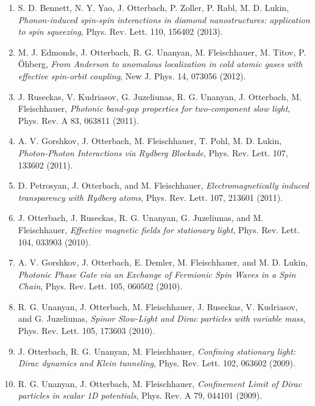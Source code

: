 \documentclass[10pt,centered]{./res} %
\begin{document}
\begin{resume}
\begin{enumerate}
  \item S. D. Bennett, N. Y. Yao, J. Otterbach, P. Zoller, P. Rabl, M. D. Lukin, \textit{Phonon-induced spin-spin interactions in diamond nanostructures: application to spin squeezing}, Phys. Rev. Lett. 110, 156402 (2013).
  
  \item M. J. Edmonds, J. Otterbach, R. G. Unanyan, M. Fleischhauer, M. Titov, P. Öhberg, \textit{From Anderson to anomalous localization in cold atomic gases with effective spin-orbit coupling}, New J. Phys. 14, 073056 (2012).
  
  \item J. Ruseckas, V. Kudriasov, G. Juzeliunas, R. G. Unanyan, J. Otterbach, M. Fleischhauer, \textit{Photonic band-gap properties for two-component slow light}, Phys. Rev. A 83, 063811 (2011).
  
  \item A. V. Gorshkov, J. Otterbach, M. Fleischhauer, T. Pohl, M. D. Lukin, \textit{Photon-Photon Interactions via Rydberg Blockade}, Phys. Rev. Lett. 107, 133602 (2011).
  
  \item D. Petrosyan, J. Otterbach, and M. Fleischhauer, \textit{Electromagnetically induced transparency with Rydberg atoms}, Phys. Rev. Lett. 107, 213601 (2011).
  
  \item J. Otterbach, J. Ruseckas, R. G. Unanyan, G. Juzeliunas, and M. Fleischhauer, \textit{Effective magnetic fields for stationary light}, Phys. Rev. Lett. 104, 033903 (2010).
  
  \item A. V. Gorshkov, J. Otterbach, E. Demler, M. Fleischhauer, and M. D. Lukin, \textit{Photonic Phase Gate via an Exchange of Fermionic Spin Waves in a Spin Chain}, Phys. Rev. Lett. 105, 060502 (2010).
  
  \item R. G. Unanyan, J. Otterbach, M. Fleischhauer, J. Ruseckas, V. Kudriasov, and G. Juzeliunas, \textit{Spinor Slow-Light and Dirac particles with variable mass}, Phys. Rev. Lett. 105, 173603 (2010).
  
  \item J. Otterbach, R. G. Unanyan, M. Fleischhauer, \textit{Confining stationary light: Dirac dynamics and Klein tunneling}, Phys. Rev. Lett. 102, 063602 (2009).
  
  \item R. G. Unanyan, J. Otterbach, M. Fleischhauer, \textit{Confinement Limit of Dirac particles in scalar 1D potentials}, Phys. Rev. A 79, 044101 (2009).
  

\end{enumerate}
\end{resume}
\end{document}
